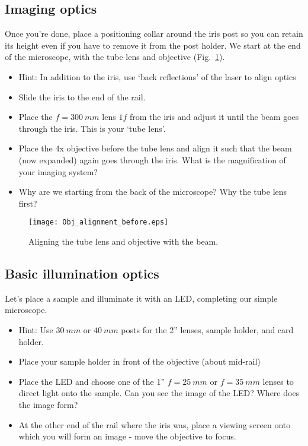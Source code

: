 \documentclass[a4paper]{report}
\begin{document}
\clearpage

\subsection{Imaging optics}
Once you're done, place a positioning collar around the iris post so you can retain its height even if you have to remove it from the post holder. We start at the end of the microscope, with the tube lens and objective (Fig.~\ref{fig:beam_obj_tube}). 

\begin{itemize}
\item Hint: In addition to the iris, use `back reflections' of the laser to align optics
\item Slide the iris to the end of the rail. 
\item Place the $f=300~mm$ lens $1f$ from the iris and adjust it until the beam goes through the iris. This is your `tube lens'.
\item Place the 4x objective before the tube lens and align it such that the beam (now expanded) again goes through the iris. What is the magnification of your imaging system?
\item Why are we starting from the back of the microscope? Why the tube lens first?
\end{itemize}

\begin{figure}[h]
\center
\texttt{[image: Obj\_alignment\_before.eps]}
\caption{Aligning the tube lens and objective with the beam.}
\label{fig:beam_obj_tube}
\end{figure}

\subsection{Basic illumination optics}
Let's place a sample and illuminate it with an LED, completing our simple microscope.

\begin{itemize}
\item Hint: Use $30~mm$ or $40~mm$ posts for the 2'' lenses, sample holder, and card holder.
\item Place your sample holder in front of the objective (about mid-rail)
\item Place the LED and choose one of the 1''{\diameter} $f=25~mm$ or $f=35~mm$ lenses to direct light onto the sample. Can you see the image of the LED? Where does the image form?
\item At the other end of the rail where the iris was, place a viewing screen onto which you will form an image - move the objective to focus.
\end{itemize}
\end{document}
